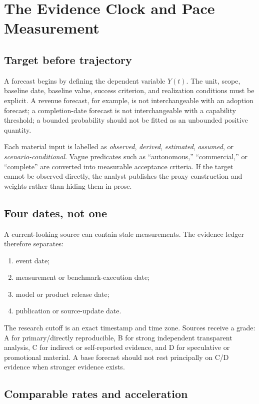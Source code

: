 
\section{The Evidence Clock and Pace Measurement}

\subsection{Target before trajectory}

A forecast begins by defining the dependent variable $Y(t)$. The unit, scope, baseline date, baseline value, success criterion, and realization conditions must be explicit. A revenue forecast, for example, is not interchangeable with an adoption forecast; a completion-date forecast is not interchangeable with a capability threshold; a bounded probability should not be fitted as an unbounded positive quantity.

Each material input is labelled as \emph{observed}, \emph{derived}, \emph{estimated}, \emph{assumed}, or \emph{scenario-conditional}. Vague predicates such as ``autonomous,'' ``commercial,'' or ``complete'' are converted into measurable acceptance criteria. If the target cannot be observed directly, the analyst publishes the proxy construction and weights rather than hiding them in prose.

\subsection{Four dates, not one}

A current-looking source can contain stale measurements. The evidence ledger therefore separates:

\begin{enumerate}
\item event date;
\item measurement or benchmark-execution date;
\item model or product release date;
\item publication or source-update date.
\end{enumerate}

The research cutoff is an exact timestamp and time zone. Sources receive a grade: A for primary/directly reproducible, B for strong independent transparent analysis, C for indirect or self-reported evidence, and D for speculative or promotional material. A base forecast should not rest principally on C/D evidence when stronger evidence exists.

\subsection{Comparable rates and acceleration}


